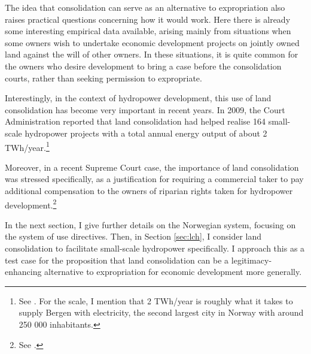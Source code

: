 The idea that consolidation can serve as an alternative to expropriation also raises practical questions concerning how it would work. Here there is already some interesting empirical data available, arising mainly from situations when some owners wish to undertake economic development projects on jointly owned land against the will of other owners. In these situations, it is quite common for the owners who desire development to bring a case before the consolidation courts, rather than seeking permission to expropriate.

Interestingly, in the context of hydropower development, this use of land consolidation has become very important in recent years. In 2009, the Court Administration reported that land consolidation had helped realise 164 small-scale hydropower projects with a total annual energy output of about 2 TWh/year.\footnote{See \cite{gevinst09}. For the scale, I mention that 2 TWh/year is roughly what it takes to supply Bergen with electricity, the second largest city in Norway with around 250 000 inhabitants.}

Moreover, in a recent Supreme Court case, the importance of land consolidation was stressed specifically, as a justification for requiring a commercial taker to pay additional compensation to the owners of riparian rights taken for hydropower development.\footnote{See \cite{klovtveit11}.}

In the next section, I give further details on the Norwegian system, focusing on the system of use directives. Then, in Section \ref{sec:lch}, I consider land consolidation to facilitate small-scale hydropower specifically. I approach this as a test case for the proposition that land consolidation can be a legitimacy-enhancing alternative to expropriation for economic development more generally.


